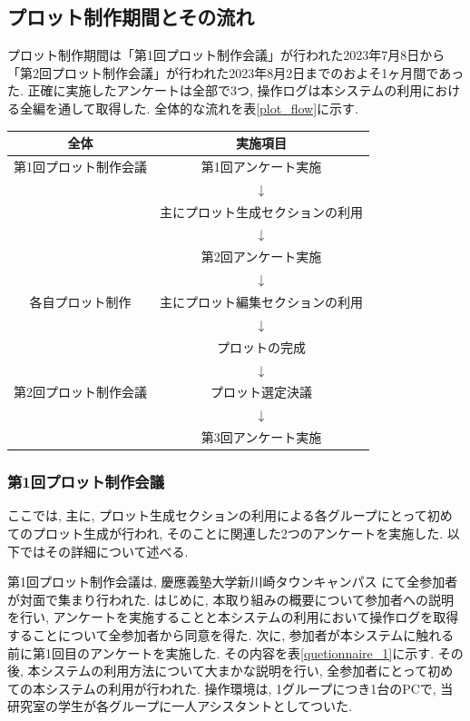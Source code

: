 \documentclass[a4j,12pt]{jsreport}
\begin{document}
\subsection{プロット制作期間とその流れ}\label{flow_of_plot}
プロット制作期間は「第1回プロット制作会議」が行われた2023年7月8日から「第2回プロット制作会議」が行われた2023年8月2日までのおよそ1ヶ月間であった. 正確に実施したアンケートは全部で3つ, 操作ログは本システムの利用における全編を通して取得した. 全体的な流れを表\ref{plot_flow}に示す.
\setlongtables
   \begin{tabularx}{\textwidth}{cc}
      \caption[具体的活用事例における全体の流れ]{具体的活用事例における全体の流れ \label{plot_flow}}
      \setlength{\belowcaptionskip}{-1pt}
      \vspace*{-0.2cm}
         \endfirsthead
   \hline
   \textbf{全体} & \textbf{実施項目} \\
   \hline
   第1回プロット制作会議 & 第1回アンケート実施 \\
   & $\downarrow$ \\
   & 主にプロット生成セクションの利用 \\
   & $\downarrow$ \\
   & 第2回アンケート実施 \\
   & $\downarrow$ \\
   各自プロット制作 & 主にプロット編集セクションの利用 \\
   & $\downarrow$ \\
   & プロットの完成 \\
   & $\downarrow$ \\
   第2回プロット制作会議 & プロット選定決議 \\
   & $\downarrow$ \\
   & 第3回アンケート実施 \\   
   \hline
   \end{tabularx}
\subsubsection{第1回プロット制作会議}
ここでは, 主に, プロット生成セクションの利用による各グループにとって初めてのプロット生成が行われ, そのことに関連した2つのアンケートを実施した. 以下ではその詳細について述べる.

第1回プロット制作会議は, 慶應義塾大学新川崎タウンキャンパス\footnotemark{} にて全参加者が対面で集まり行われた. はじめに, 本取り組みの概要について参加者への説明を行い, アンケートを実施することと本システムの利用において操作ログを取得することについて全参加者から同意を得た. 次に, 参加者が本システムに触れる前に第1回目のアンケートを実施した. その内容を表\ref{quetionnaire_1}に示す. その後, 本システムの利用方法について大まかな説明を行い, 全参加者にとって初めての本システムの利用が行われた. 操作環境は, 1グループにつき1台のPCで, 当研究室の学生が各グループに一人アシスタントとしてついた.
\end{document}
